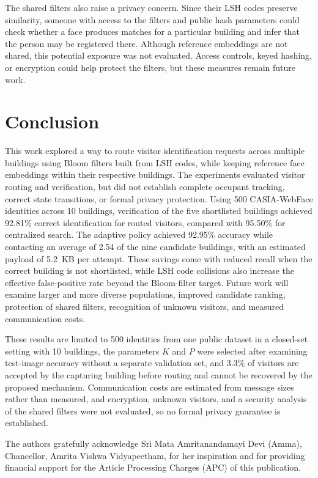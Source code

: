 \documentclass[pdflatex,sn-mathphys-num]{sn-jnl}%
\theoremstyle{thmstyleone}%
\theoremstyle{thmstyletwo}%
\theoremstyle{thmstylethree}%
\begin{document}
The shared filters also raise a privacy concern. Since their LSH codes preserve similarity, someone with access to the filters and public hash parameters could check whether a face produces matches for a particular building and infer that the person may be registered there. Although reference embeddings are not shared, this potential exposure was not evaluated. Access controls, keyed hashing, or encryption could help protect the filters, but these measures remain future work.




\section{Conclusion}
\label{sec:conclusion}

This work explored a way to route visitor identification requests across multiple buildings using Bloom filters built from LSH codes, while keeping reference face embeddings within their respective buildings. The experiments evaluated visitor routing and verification, but did not establish complete occupant tracking, correct state transitions, or formal privacy protection. Using 500 CASIA-WebFace identities across 10 buildings, verification of the five shortlisted buildings achieved 92.81\% correct identification for routed visitors, compared with 95.50\% for centralized search. The adaptive policy achieved 92.95\% accuracy while contacting an average of 2.54 of the nine candidate buildings, with an estimated payload of 5.2~KB per attempt. These savings come with reduced recall when the correct building is not shortlisted, while LSH code collisions also increase the effective false-positive rate beyond the Bloom-filter target. Future work will examine larger and more diverse populations, improved candidate ranking, protection of shared filters, recognition of unknown visitors, and measured communication costs.

These results are limited to 500 identities from one public dataset in a closed-set setting with 10 buildings, the parameters $K$ and $P$ were selected after examining test-image accuracy without a separate validation set, and 3.3\% of visitors are accepted by the capturing building before routing and cannot be recovered by the proposed mechanism. Communication costs are estimated from message sizes rather than measured, and encryption, unknown visitors, and a security analysis of the shared filters were not evaluated, so no formal privacy guarantee is established.



The authors gratefully acknowledge Sri Mata Amritanandamayi Devi (Amma), Chancellor, Amrita Vishwa Vidyapeetham, for her inspiration and for providing financial support for the Article Processing Charges (APC) of this publication.

\end{document}
